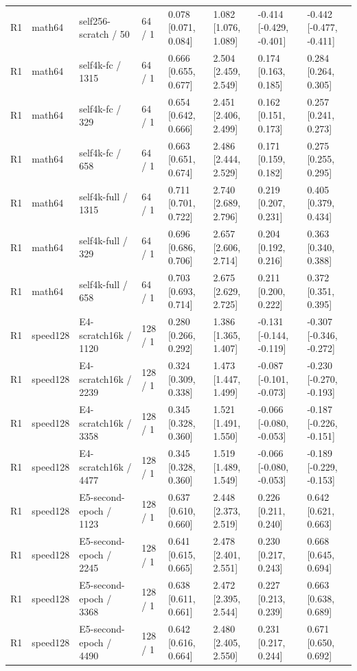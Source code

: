 \begin{tabular}{llllllll}
R1 & math64 & self256-scratch / 50 & 64 / 1 & 0.078 [0.071, 0.084] & 1.082 [1.076, 1.089] & -0.414 [-0.429, -0.401] & -0.442 [-0.477, -0.411] \\
R1 & math64 & self4k-fc / 1315 & 64 / 1 & 0.666 [0.655, 0.677] & 2.504 [2.459, 2.549] & 0.174 [0.163, 0.185] & 0.284 [0.264, 0.305] \\
R1 & math64 & self4k-fc / 329 & 64 / 1 & 0.654 [0.642, 0.666] & 2.451 [2.406, 2.499] & 0.162 [0.151, 0.173] & 0.257 [0.241, 0.273] \\
R1 & math64 & self4k-fc / 658 & 64 / 1 & 0.663 [0.651, 0.674] & 2.486 [2.444, 2.529] & 0.171 [0.159, 0.182] & 0.275 [0.255, 0.295] \\
R1 & math64 & self4k-full / 1315 & 64 / 1 & 0.711 [0.701, 0.722] & 2.740 [2.689, 2.796] & 0.219 [0.207, 0.231] & 0.405 [0.379, 0.434] \\
R1 & math64 & self4k-full / 329 & 64 / 1 & 0.696 [0.686, 0.706] & 2.657 [2.606, 2.714] & 0.204 [0.192, 0.216] & 0.363 [0.340, 0.388] \\
R1 & math64 & self4k-full / 658 & 64 / 1 & 0.703 [0.693, 0.714] & 2.675 [2.629, 2.725] & 0.211 [0.200, 0.222] & 0.372 [0.351, 0.395] \\
R1 & speed128 & E4-scratch16k / 1120 & 128 / 1 & 0.280 [0.266, 0.292] & 1.386 [1.365, 1.407] & -0.131 [-0.144, -0.119] & -0.307 [-0.346, -0.272] \\
R1 & speed128 & E4-scratch16k / 2239 & 128 / 1 & 0.324 [0.309, 0.338] & 1.473 [1.447, 1.499] & -0.087 [-0.101, -0.073] & -0.230 [-0.270, -0.193] \\
R1 & speed128 & E4-scratch16k / 3358 & 128 / 1 & 0.345 [0.328, 0.360] & 1.521 [1.491, 1.550] & -0.066 [-0.080, -0.053] & -0.187 [-0.226, -0.151] \\
R1 & speed128 & E4-scratch16k / 4477 & 128 / 1 & 0.345 [0.328, 0.360] & 1.519 [1.489, 1.549] & -0.066 [-0.080, -0.053] & -0.189 [-0.229, -0.153] \\
R1 & speed128 & E5-second-epoch / 1123 & 128 / 1 & 0.637 [0.610, 0.660] & 2.448 [2.373, 2.519] & 0.226 [0.211, 0.240] & 0.642 [0.621, 0.663] \\
R1 & speed128 & E5-second-epoch / 2245 & 128 / 1 & 0.641 [0.615, 0.665] & 2.478 [2.401, 2.551] & 0.230 [0.217, 0.243] & 0.668 [0.645, 0.694] \\
R1 & speed128 & E5-second-epoch / 3368 & 128 / 1 & 0.638 [0.611, 0.661] & 2.472 [2.395, 2.544] & 0.227 [0.213, 0.239] & 0.663 [0.638, 0.689] \\
R1 & speed128 & E5-second-epoch / 4490 & 128 / 1 & 0.642 [0.616, 0.664] & 2.480 [2.405, 2.550] & 0.231 [0.217, 0.244] & 0.671 [0.650, 0.692] \\

\end{tabular}
